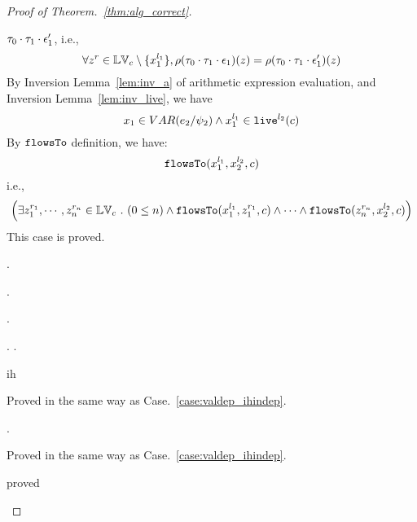 \begin{proof}[Proof of Theorem.~\ref{thm:alg_correct}]
\begin{case}[$P(\cdot)$]
$\mathtt{\tau}_0 \cdot \mathtt{\tau}_1 \cdot \mathtt{\epsilon}_1'$, i.e.,
\[
  \forall z^r \in \mathbb{LV}_c \setminus \{x_1^{l_1}\} ,
  \rho(\mathtt{\tau}_0 \cdot \mathtt{\tau}_1 \cdot \mathtt{\epsilon}_1) (z) =  
  \rho(\mathtt{\tau}_0 \cdot \mathtt{\tau}_1 \cdot \mathtt{\epsilon}_1') (z)
\]
%
By {Inversion Lemma~\ref{lem:inv_a}} of arithmetic expression evaluation, and Inversion Lemma~\ref{lem:inv_live}, we have 
\[
  x_1 \in VAR(e_2 / \psi_2) 
  \land x_1^{l_1} \in \mathtt{live}^{l_2}(c)
\]
%
By $\mathtt{flowsTo}$ definition, we have:
%
\[
\mathtt{flowsTo}(x_1^{l_1}, {x}_2^{l_2}, c)
\]
i.e.,
%
\[
\Big(\exists z_1^{r_1}, \cdots, z_n^{r_n} \in \mathbb{LV}_{{c}} ~.~ (0 \leq n )
 \land \mathtt{flowsTo}(x_1^{l_1}, z_1^{r_1}, c) \land \cdots \land \mathtt{flowsTo}(z_n^{r_n}, {x}_2^{l_2}, c) \Big)
 \]
%
This case is proved.
\end{case}
%
\begin{case}
\label{case:valdep_ih}.
\begin{subcase}
\label{case:valdep_ihindep}.
\end{subcase}
\begin{subcase}
\label{case:valdep_ihdep}.
\begin{subsubcase}.
\label{case:valdep_ihdepasn}.
\begin{subsubsubcase}
ih
\end{subsubsubcase}
\begin{subsubsubcase}
Proved in the same way as Case.~\ref{case:valdep_ihindep}.
\end{subsubsubcase}
\end{subsubcase}
\begin{subsubcase}.
\begin{subsubsubcase}
Proved in the same way as Case.~\ref{case:valdep_ihindep}.
\end{subsubsubcase}
\begin{subsubsubcase}
proved 
\end{subsubsubcase}
\end{subsubcase}
\end{subcase}

\end{case}
\end{proof}
